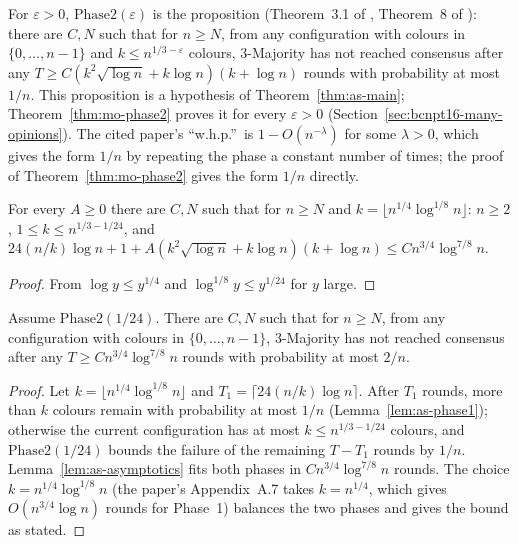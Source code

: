 \begin{definition}\label{def:as-phase2}
\leanok{}
For $\varepsilon>0$, $\mathrm{Phase2}(\varepsilon)$ is the proposition (Theorem~3.1 of
\cite{BCNPT16}, Theorem~8 of \cite{BCEKMN17}): there are $C,N$ such that for $n\ge N$, from any
configuration with colours in $\{0,\dots,n-1\}$ and $k\le n^{1/3-\varepsilon}$ colours,
3-Majority has not reached consensus after any
$T\ge C(k^2\sqrt{\log n}+k\log n)(k+\log n)$ rounds with probability at most $1/n$.
This proposition is a hypothesis of Theorem~\ref{thm:as-main}; Theorem~\ref{thm:mo-phase2}
proves it for every $\varepsilon>0$ (Section~\ref{sec:bcnpt16-many-opinions}). The cited paper's
``w.h.p.''\ is $1-O(n^{-\lambda})$ for some $\lambda>0$, which gives the form $1/n$ by repeating
the phase a constant number of times; the proof of Theorem~\ref{thm:mo-phase2} gives the form
$1/n$ directly.
\end{definition}

\begin{lemma}\label{lem:as-asymptotics}
\leanok
For every $A\ge0$ there are $C,N$ such that for $n\ge N$ and
$k=\lfloor n^{1/4}\log^{1/8}n\rfloor$: $n\ge2$, $1\le k\le n^{1/3-1/24}$, and
$24(n/k)\log n+1+A(k^2\sqrt{\log n}+k\log n)(k+\log n)\le Cn^{3/4}\log^{7/8}n$.
\end{lemma}
\begin{proof}\leanok
From $\log y\le y^{1/4}$ and $\log^{1/8}y\le y^{1/24}$ for $y$ large.
\end{proof}

\begin{theorem}\label{thm:as-main}
\leanok
{}
Assume $\mathrm{Phase2}(1/24)$. There are $C,N$ such that for $n\ge N$, from any configuration
with colours in $\{0,\dots,n-1\}$, 3-Majority has not reached consensus after any
$T\ge Cn^{3/4}\log^{7/8}n$ rounds with probability at most $2/n$.
\end{theorem}
\begin{proof}\leanok
Let $k=\lfloor n^{1/4}\log^{1/8}n\rfloor$ and $T_1=\lceil24(n/k)\log n\rceil$. After $T_1$ rounds,
more than $k$ colours remain with probability at most $1/n$ (Lemma~\ref{lem:as-phase1});
otherwise the current configuration has at most $k\le n^{1/3-1/24}$ colours, and
$\mathrm{Phase2}(1/24)$ bounds the failure of the remaining $T-T_1$ rounds by $1/n$.
Lemma~\ref{lem:as-asymptotics} fits both phases in $Cn^{3/4}\log^{7/8}n$ rounds. The choice
$k=n^{1/4}\log^{1/8}n$ (the paper's Appendix~A.7 takes $k=n^{1/4}$, which gives
$O(n^{3/4}\log n)$ rounds for Phase~1) balances the two phases and gives the bound as stated.
\end{proof}


